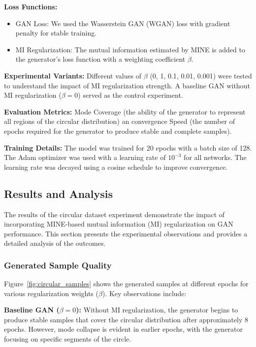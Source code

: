 \documentclass[lettersize,journal]{IEEEtran}
\begin{document}
    \textbf{Loss Functions:}
    \begin{itemize}
        \item GAN Loss: We used the Wasserstein GAN (WGAN) loss with gradient penalty for stable training.
        \item MI Regularization: The mutual information estimated by MINE is added to the generator's loss function with a weighting coefficient \( \beta \).
    \end{itemize}
    
    \textbf{Experimental Variants:} Different values of \( \beta \) (0, 1, 0.1, 0.01, 0.001) were tested to understand the impact of MI regularization strength. A baseline GAN without MI regularization (\( \beta = 0 \)) served as the control experiment.
    
    \textbf{Evaluation Metrics:}
    Mode Coverage (the ability of the generator to represent all regions of the circular distribution) an convergence Speed (the number of epochs required for the generator to produce stable and complete samples).
    
    \textbf{Training Details:} The model was trained for 20 epochs with a batch size of 128. The Adam optimizer was used with a learning rate of \( 10^{-3} \) for all networks. The learning rate was decayed using a cosine schedule to improve convergence.

\subsection{Results and Analysis}

The results of the circular dataset experiment demonstrate the impact of incorporating MINE-based mutual information (MI) regularization on GAN performance. This section presents the experimental observations and provides a detailed analysis of the outcomes.

\subsubsection{Generated Sample Quality}
Figure~\ref{fig:circular_samples} shows the generated samples at different epochs for various regularization weights (\( \beta \)). Key observations include:

    \textbf{Baseline GAN (\( \beta = 0 \)):} Without MI regularization, the generator begins to produce stable samples that cover the circular distribution after approximately 8 epochs. However, mode collapse is evident in earlier epochs, with the generator focusing on specific segments of the circle.
    
\end{document}
